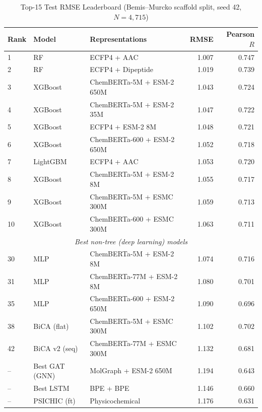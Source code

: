 \documentclass[11pt,twocolumn,a4paper]{article}
\begin{document}
\begin{table}[t]
\centering
\caption{Top-15 Test RMSE Leaderboard (Bemis--Murcko scaffold split, seed 42, $N=4{,}715$)}
\label{tab:leaderboard}
\begin{tabular}{lllrr}
\toprule
\textbf{Rank} & \textbf{Model} & \textbf{Representations} & \textbf{RMSE} & \textbf{Pearson $R$} \\
\midrule
 1 & RF              & ECFP4 + AAC                  & 1.007 & 0.747 \\
 2 & RF              & ECFP4 + Dipeptide            & 1.019 & 0.739 \\
 3 & XGBoost         & ChemBERTa-5M + ESM-2 650M    & 1.043 & 0.724 \\
 4 & XGBoost         & ChemBERTa-5M + ESM-2 35M     & 1.047 & 0.722 \\
 5 & XGBoost         & ECFP4 + ESM-2 8M             & 1.048 & 0.721 \\
 6 & XGBoost         & ChemBERTa-600 + ESM-2 650M   & 1.052 & 0.718 \\
 7 & LightGBM        & ECFP4 + AAC                  & 1.053 & 0.720 \\
 8 & XGBoost         & ChemBERTa-5M + ESM-2 8M      & 1.055 & 0.717 \\
 9 & XGBoost         & ChemBERTa-5M + ESMC 300M     & 1.059 & 0.713 \\
10 & XGBoost         & ChemBERTa-600 + ESMC 300M    & 1.063 & 0.711 \\
\midrule
\multicolumn{5}{c}{\textit{Best non-tree (deep learning) models}} \\
30 & MLP             & ChemBERTa-5M + ESM-2 8M       & 1.074 & 0.716 \\
31 & MLP             & ChemBERTa-77M + ESM-2 8M      & 1.080 & 0.701 \\
35 & MLP             & ChemBERTa-600 + ESM-2 650M    & 1.090 & 0.696 \\
38 & BiCA (flat)     & ChemBERTa-5M + ESMC 300M      & 1.102 & 0.702 \\
42 & BiCA v2 (seq)   & ChemBERTa-77M + ESMC 300M     & 1.132 & 0.681 \\
-- & Best GAT (GNN)  & MolGraph + ESM-2 650M         & 1.194 & 0.643 \\
-- & Best LSTM        & BPE + BPE                    & 1.146 & 0.660 \\
-- & PSICHIC (ft)    & Physicochemical               & 1.176 & 0.631 \\
\bottomrule
\end{tabular}
\end{table}
\end{document}
